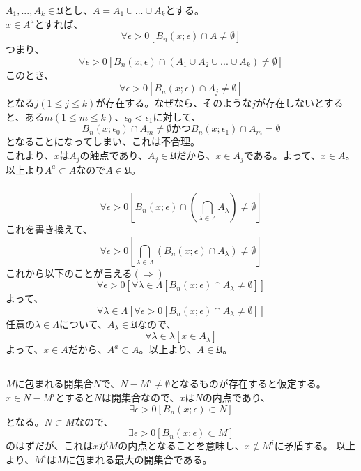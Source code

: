 \documentclass{jsarticle}
\begin{document}
\subsubsection{}
$A_1,...,A_k\in \mathfrak{U}$とし、$A=A_1\cup...\cup A_k$とする。\\
$x\in A^a$とすれば、
\[\forall \epsilon >0 [B_n(x;\epsilon)\cap A\neq \emptyset]\]
つまり、
\[\forall \epsilon >0 [B_n(x;\epsilon)\cap (A_1\cup A_2\cup ...\cup A_k)\neq \emptyset]\]
このとき、
\[\forall\epsilon >0[B_n(x;\epsilon)\cap A_j\neq \emptyset]\]
となる$j(1\leq j \leq k)$が存在する。なぜなら、そのような$j$が存在しないとすると、ある$m(1\leq m\leq k)$、$\epsilon_0<\epsilon_1$に対して、
\[B_n(x;\epsilon_0)\cap A_m\neq \emptyset　かつ　B_n(x;\epsilon_1)\cap A_m = \emptyset\]
となることになってしまい、これは不合理。\\
これより、$x$は$A_j$の触点であり、$A_j\in\mathfrak{U}$だから、$x\in A_j$である。よって、$x\in A$。以上より$A^a\subset A$なので$A\in\mathfrak{U}$。



\subsubsection{}
\[\forall\epsilon>0[B_n(x;\epsilon)\cap(\bigcap_{\lambda\in\Lambda}A_\lambda)\neq\emptyset]\]
これを書き換えて、
\[\forall\epsilon>0[\bigcap_{\lambda\in\Lambda}(B_n(x;\epsilon)\cap A_\lambda)\neq\emptyset]\]
これから以下のことが言える$(\Longrightarrow)$
\[\forall\epsilon>0[\forall\lambda\in\Lambda[B_n(x;\epsilon)\cap A_\lambda\neq\emptyset]]\]
よって、
\[\forall\lambda\in\Lambda[\forall\epsilon>0[B_n(x;\epsilon)\cap A_\lambda\neq\emptyset]]\]
任意の$\lambda\in\Lambda$について、$A_\lambda\in\mathfrak{U}$なので、
\[\forall\lambda\in\lambda[x\in A_\lambda]\]
よって、$x\in A$だから、$A^a\subset A$。以上より、$A\in\mathfrak{U}$。

\subsection{}
\subsubsection{}
$M$に包まれる開集合$N$で、$N-M^i\neq \emptyset$となるものが存在すると仮定する。
$x\in N-M^i$とすると$N$は開集合なので、$x$は$N$の内点であり、
\[\exists\epsilon>0[B_n(x;\epsilon)\subset N]\]
となる。$N\subset M$なので、
\[\exists\epsilon>0[B_n(x;\epsilon)\subset M]\]
のはずだが、これは$x$が$M$の内点となることを意味し、$x\notin M^i$に矛盾する。
以上より、$M^i$は$M$に包まれる最大の開集合である。
\end{document}

